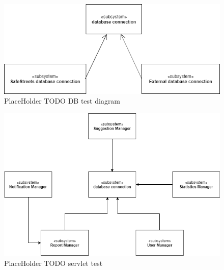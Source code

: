 \begin{figure}[H]
\centering
\includegraphics[width=\textwidth]{Images/TestDBdiagram.png}
\caption{\label{fig:ComWI}PlaceHolder TODO DB test diagram}
\end{figure}
\begin{figure}[H]
\centering
\includegraphics[width=\textwidth]{Images/TestServlet.png}
\caption{\label{fig:ComWI}PlaceHolder TODO servlet test}
\end{figure}
